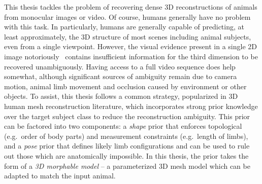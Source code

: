 This thesis tackles the problem of recovering dense 3D reconstructions of animals from monocular images or video. Of course, humans generally have no problem with this task. In particularly, humans are generally capable of predicting, at least approximately, the 3D structure of most scenes including animal subjects, even from a single viewpoint. However, the visual evidence present in a single 2D image notoriously~\citep{Faugeras01geometry} contains insufficient information for the third dimension to be recovered unambiguously. Having access to a full video sequence does help somewhat, although significant sources of ambiguity remain due to camera motion, animal limb movement and occlusion caused by environment or other objects. 
To assist, this thesis follows a common strategy, popularized in 3D human mesh reconstruction literature, which incorporates strong prior knowledge over the target subject class to reduce the reconstruction ambiguity. This prior can be factored into two components: a \emph{shape} prior that enforces topological (e.g.\ order of body parts) and measurement constraints (e.g.\ length of limbs), and a \emph{pose} prior that defines likely limb configurations and can be used to rule out those which are anatomically impossible. 
In this thesis, the prior takes the form of a \emph{3D morphable model} -- a parameterized 3D mesh model which can be adapted to match the input animal.

